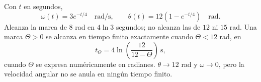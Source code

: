 Con \(t\) en segundos,
\[
\omega(t)=3e^{-t/4}\quad\mathrm{rad/s},\qquad
\theta(t)=12(1-e^{-t/4})\quad\mathrm{rad}.
\]
Alcanza la marca de \(8\) rad en \(4\ln3\) segundos; no alcanza las de \(12\) ni \(15\) rad. Una marca \(\Theta>0\) se alcanza en tiempo finito exactamente cuando \(\Theta<12\) rad, en
\[
t_\Theta=4\ln\!\left(\frac{12}{12-\Theta}\right)\ \mathrm s,
\]
cuando \(\Theta\) se expresa numéricamente en radianes. \(\theta\to12\) rad y \(\omega\to0\), pero la velocidad angular no se anula en ningún tiempo finito.
